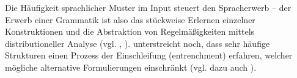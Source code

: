 Die Häufigkeit sprachlicher Muster im Input steuert den Spracherwerb -- der Erwerb einer Grammatik ist also das stückweise Erlernen einzelner Konstruktionen und die Abstraktion von Regelmäßigkeiten mittels distributioneller Analyse (vgl. \cite{Ellis08}, \cite{Bybee06}).
\cite{Bybee06} unterstreicht noch, dass sehr häufige Strukturen einen Prozess der Einschleifung (entrenchment) erfahren, welcher mögliche alternative Formulierungen einschränkt (vgl. dazu auch \cite{Tomasello06}).










